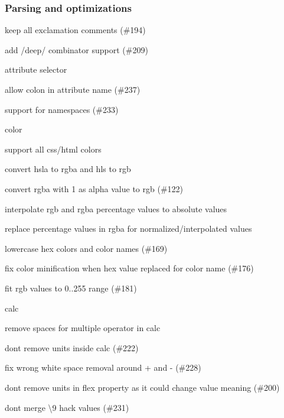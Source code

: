 \subsubsection*{Parsing and optimizations}


\begin{DoxyItemize}
\item keep all exclamation comments (\#194)
\item add {\ttfamily /deep/} combinator support (\#209)
\item attribute selector
\begin{DoxyItemize}
\item allow colon in attribute name (\#237)
\item support for namespaces (\#233)
\end{DoxyItemize}
\item color
\begin{DoxyItemize}
\item support all css/html colors
\item convert {\ttfamily hsla} to {\ttfamily rgba} and {\ttfamily hls} to {\ttfamily rgb}
\item convert {\ttfamily rgba} with 1 as alpha value to {\ttfamily rgb} (\#122)
\item interpolate {\ttfamily rgb} and {\ttfamily rgba} percentage values to absolute values
\item replace percentage values in {\ttfamily rgba} for normalized/interpolated values
\item lowercase hex colors and color names (\#169)
\item fix color minification when hex value replaced for color name (\#176)
\item fit rgb values to 0..255 range (\#181)
\end{DoxyItemize}
\item calc
\begin{DoxyItemize}
\item remove spaces for multiple operator in calc
\item don\textquotesingle{}t remove units inside calc (\#222)
\item fix wrong white space removal around {\ttfamily +} and {\ttfamily -\/} (\#228)
\end{DoxyItemize}
\item don\textquotesingle{}t remove units in {\ttfamily flex} property as it could change value meaning (\#200)
\item don\textquotesingle{}t merge {\ttfamily \textbackslash{}9} hack values (\#231)

\end{DoxyItemize}
